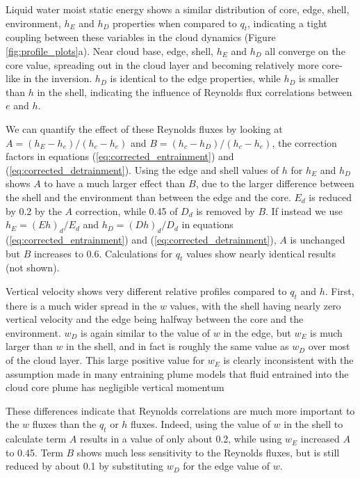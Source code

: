 \documentclass[draft,grl]{agutex}
\begin{document}
\begin{article}
Liquid water moist static energy shows a similar distribution of core, edge, 
shell, environment, $h_E$ and $h_D$ properties when compared to $q_t$, 
indicating a tight coupling between these variables in the cloud dynamics 
(Figure \ref{fig:profile_plots}a).  Near cloud base, edge, shell, $h_E$ and 
$h_D$ all converge on the core value, spreading out in the cloud layer and 
becoming relatively more core-like in the inversion.  $h_D$ is identical to the 
edge properties, while $h_D$ is smaller than $h$ in the shell, indicating the 
influence of Reynolds flux correlations between $e$ and $h$.

We can quantify the effect of these Reynolds fluxes by looking at 
$A = (h_E - h_e)/(h_c - h_e)$ and $B = (h_c - h_D)/(h_c - h_e)$, the correction 
factors in equations (\ref{eq:corrected_entrainment}) and 
(\ref{eq:corrected_detrainment}).  Using the edge and shell values of $h$ for 
$h_E$ and $h_D$ shows $A$ to have a much larger effect than $B$, due to the 
larger difference between the shell and the environment than between the edge 
and the core.  $E_d$ is reduced by 0.2 by the $A$ correction, while 0.45 of
$D_d$ is removed by $B$.  If instead we use $h_E = (E h)_d/E_d$ and 
$h_D = (D h)_d/D_d$ in equations (\ref{eq:corrected_entrainment}) and 
(\ref{eq:corrected_detrainment}), $A$ is unchanged but $B$ increases to 0.6.  
Calculations for $q_t$ values show nearly identical results (not shown).

Vertical velocity shows very different relative profiles compared to
$q_t$ and $h$.  First, there is a much wider spread in the $w$ values,
with the shell having nearly zero vertical velocity and the edge being
halfway between the core and the environment.  $w_D$ is again similar
to the value of $w$ in the edge, but $w_E$ is much larger than $w$ in
the shell, and in fact is roughly the same value as $w_D$ over most of
the cloud layer.  This large positive value for $w_E$ is clearly inconsistent
with the assumption made in many entraining plume models that 
fluid entrained into the cloud core plume has negligible vertical momentum
\citep{Simpson1969,Gregory2001,Siebesma2003}


These differences indicate that Reynolds correlations are much more important 
to the $w$ fluxes than the $q_t$ or $h$ fluxes.  Indeed, using the value 
of $w$ in the shell to calculate term $A$ results in a value of only about 0.2, 
while using $w_E$ increased $A$ to 0.45.  Term $B$ shows much less sensitivity 
to the Reynolds fluxes, but is still reduced by about 0.1 by substituting $w_D$ 
for the edge value of $w$.


\end{article}
\end{document}
